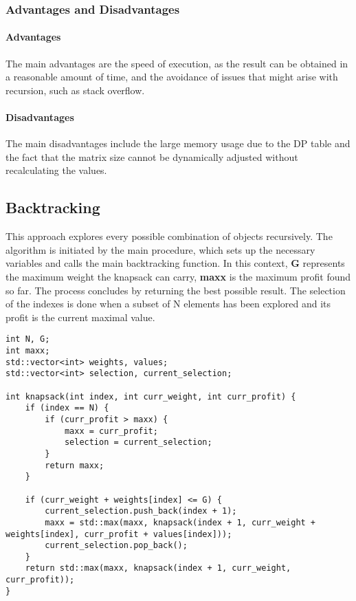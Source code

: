 \documentclass[runningheads]{llncs}
\begin{document}
\subsubsection{Advantages and Disadvantages}
\paragraph{Advantages}
The main advantages are the speed of execution, as the result can be obtained in a reasonable amount
of time, and the avoidance of issues that might arise with recursion, such as stack overflow.

\paragraph{Disadvantages}
The main disadvantages include the large memory usage due to the DP table and the fact that the 
matrix size cannot be dynamically adjusted without recalculating the values.

\subsection{Backtracking}

This approach explores every possible combination of objects recursively. The algorithm is initiated
by the main procedure, which sets up the necessary variables and calls the main backtracking
function. In this context, \textbf{G} represents the maximum weight the knapsack can carry, 
\textbf{maxx} is the maximum profit found so far. The process concludes by returning the best 
possible result. The selection of the indexes is done when a subset of N elements has been explored
and its profit is the current maximal value.


\begin{lstlisting}
int N, G;
int maxx;
std::vector<int> weights, values;
std::vector<int> selection, current_selection;

int knapsack(int index, int curr_weight, int curr_profit) {
	if (index == N) {
		if (curr_profit > maxx) {
			maxx = curr_profit;
			selection = current_selection;
		}
		return maxx;
	}

	if (curr_weight + weights[index] <= G) {
		current_selection.push_back(index + 1);
		maxx = std::max(maxx, knapsack(index + 1, curr_weight + weights[index], curr_profit + values[index]));
		current_selection.pop_back();
	}
	return std::max(maxx, knapsack(index + 1, curr_weight, curr_profit));
}
\end{lstlisting}
\end{document}
